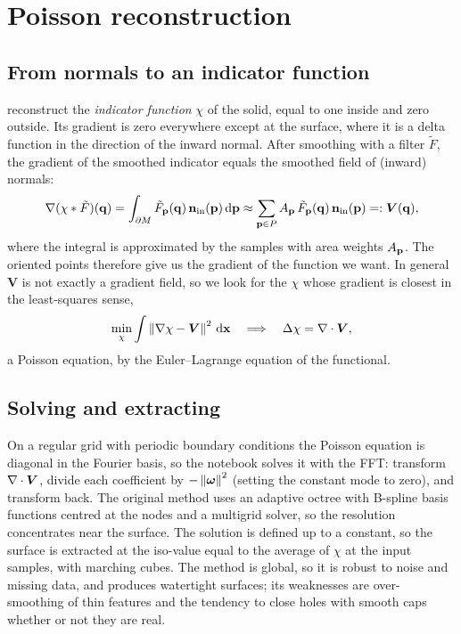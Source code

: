 \section{Poisson reconstruction}

\subsection{From normals to an indicator function}

 reconstruct the \emph{indicator function} $\chi$ of the solid, equal to one
inside and zero outside. Its gradient is zero everywhere except at the surface, where it is a delta
function in the direction of the inward normal. After smoothing with a filter $\tilde F$, the
gradient of the smoothed indicator equals the smoothed field of (inward) normals:
\begin{equation}
\nabla(\chi*\tilde F)(\mathbf{q})=\int_{\partial M}\tilde F_{\mathbf{p}}(\mathbf{q})\,\mathbf{n}_{\mathrm{in}}(\mathbf{p})\,\mathrm{d}\mathbf{p}\approx
\sum_{\mathbf{p}\in P}A_{\mathbf{p}}\,\tilde F_{\mathbf{p}}(\mathbf{q})\,\mathbf{n}_{\mathrm{in}}(\mathbf{p})=:\bm V(\mathbf{q}),
\end{equation}
where the integral is approximated by the samples with area weights $A_{\mathbf{p}}$. The oriented points
therefore give us the gradient of the function we want. In general $\bm V$ is not exactly a gradient
field, so we look for the $\chi$ whose gradient is closest in the least-squares sense,
\begin{equation}
\min_\chi\int\left\lVert \nabla\chi-\bm V\right\rVert^2\,\mathrm{d}\mathbf{x}\quad\Longrightarrow\quad\Delta\chi=\nabla\cdot\bm V ,
\end{equation}
a Poisson equation, by the Euler--Lagrange equation of the functional.

\subsection{Solving and extracting}

On a regular grid with periodic boundary conditions the Poisson equation is diagonal in the
Fourier basis, so the notebook solves it with the FFT: transform $\nabla\cdot\bm V$, divide each
coefficient by $-\left\lVert \boldsymbol\omega\right\rVert^2$ (setting the constant mode to zero), and transform back.
The original method uses an adaptive octree with B-spline basis functions centred at the nodes and
a multigrid solver, so the resolution concentrates near the surface. The solution is defined up to
a constant, so the surface is extracted at the iso-value equal to the average of $\chi$ at the
input samples, with marching cubes. The method is global, so it is robust to noise and missing
data, and produces watertight surfaces; its weaknesses are over-smoothing of thin features and the
tendency to close holes with smooth caps whether or not they are real.

